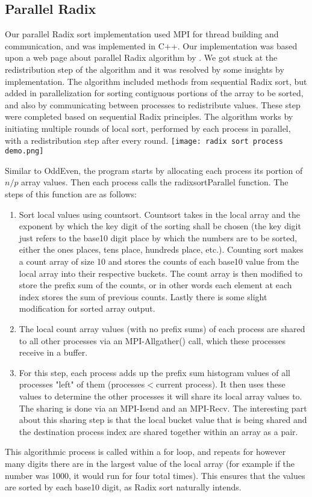 \documentclass[11pt,twocolumn]{article}
\begin{document}
\subsection {Parallel Radix}\label{soln}
Our parallel Radix sort implementation used MPI for thread building and communication, and was implemented in C++. Our implementation was based upon a web page about parallel Radix algorithm by \cite{Jordy}. We got stuck at the redistribution step of the algorithm and it was resolved by some insights by \cite{Parallel-Radix} implementation. The algorithm included methods from sequential Radix sort, but added in parallelization for sorting contiguous portions of the array to be sorted, and also by communicating between processes to redistribute values. These step were completed based on sequential Radix principles. The algorithm works by initiating multiple rounds of local sort, performed by each process in parallel, with a redistribution step after every round.
\texttt{[image: radix sort process demo.png]}

Similar to OddEven, the program starts by allocating each process its portion of $n/p$ array values. Then each process calls the radixsortParallel function. The steps of this function are as follows:
\begin{enumerate}
    \item Sort local values using countsort. Countsort takes in the local array and the exponent by which the key digit of the sorting shall be chosen (the key digit just refers to the base10 digit place by which the numbers are to be sorted, either the ones places, tens place, hundreds place, etc.). Counting sort makes a count array of size 10 and stores the counts of each base10 value from the local array into their respective buckets. The count array is then modified to store the prefix sum of the counts, or in other words each element at each index stores the sum of previous counts. Lastly there is some slight modification for sorted array output.
    \item The local count array values (with no prefix sums) of each process are shared to all other processes via an MPI-Allgather() call, which these processes receive in a buffer.
    \item For this step, each process adds up the prefix sum histogram values of all processes "left" of them (processes$<$current process). It then uses these values to determine the other processes it will share its local array values to. The sharing is done via an MPI-Isend and an MPI-Recv. The interesting part about this sharing step is that the local bucket value that is being shared and the destination process index are shared together within an array as a pair.
\end{enumerate}
This algorithmic process is called within a for loop, and repeats for however many digits there are in the largest value of the local array (for example if the number was 1000, it would run for four total times). This ensures that the values are sorted by each base10 digit, as Radix sort naturally intends. 
\end{document}

